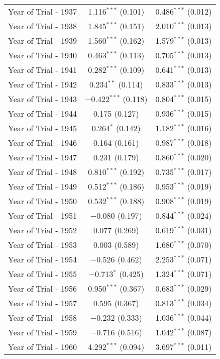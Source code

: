 \begin{table}[!h]
\begin{tabular}{@{\extracolsep{5pt}}lcc}
  Year of Trial - 1937 & 1.116$^{***}$ (0.101) & 0.486$^{***}$ (0.012) \\ 
  Year of Trial - 1938 & 1.845$^{***}$ (0.151) & 2.010$^{***}$ (0.013) \\ 
  Year of Trial - 1939 & 1.560$^{***}$ (0.162) & 1.579$^{***}$ (0.013) \\ 
  Year of Trial - 1940 & 0.463$^{***}$ (0.113) & 0.705$^{***}$ (0.013) \\ 
  Year of Trial - 1941 & 0.282$^{***}$ (0.109) & 0.641$^{***}$ (0.013) \\ 
  Year of Trial - 1942 & 0.234$^{**}$ (0.114) & 0.833$^{***}$ (0.013) \\ 
  Year of Trial - 1943 & $-$0.422$^{***}$ (0.118) & 0.804$^{***}$ (0.015) \\ 
  Year of Trial - 1944 & 0.175 (0.127) & 0.936$^{***}$ (0.015) \\ 
  Year of Trial - 1945 & 0.264$^{*}$ (0.142) & 1.182$^{***}$ (0.016) \\ 
  Year of Trial - 1946 & 0.164 (0.161) & 0.987$^{***}$ (0.018) \\ 
  Year of Trial - 1947 & 0.231 (0.179) & 0.860$^{***}$ (0.020) \\ 
  Year of Trial - 1948 & 0.810$^{***}$ (0.192) & 0.735$^{***}$ (0.017) \\ 
  Year of Trial - 1949 & 0.512$^{***}$ (0.186) & 0.953$^{***}$ (0.019) \\ 
  Year of Trial - 1950 & 0.532$^{***}$ (0.188) & 0.908$^{***}$ (0.019) \\ 
  Year of Trial - 1951 & $-$0.080 (0.197) & 0.844$^{***}$ (0.024) \\ 
  Year of Trial - 1952 & 0.077 (0.269) & 0.619$^{***}$ (0.031) \\ 
  Year of Trial - 1953 & 0.003 (0.589) & 1.680$^{***}$ (0.070) \\ 
  Year of Trial - 1954 & $-$0.526 (0.462) & 2.253$^{***}$ (0.071) \\ 
  Year of Trial - 1955 & $-$0.713$^{*}$ (0.425) & 1.324$^{***}$ (0.071) \\ 
  Year of Trial - 1956 & 0.950$^{***}$ (0.367) & 0.683$^{***}$ (0.029) \\ 
  Year of Trial - 1957 & 0.595 (0.367) & 0.813$^{***}$ (0.034) \\ 
  Year of Trial - 1958 & $-$0.232 (0.333) & 1.036$^{***}$ (0.044) \\ 
  Year of Trial - 1959 & $-$0.716 (0.516) & 1.042$^{***}$ (0.087) \\ 
  Year of Trial - 1960 & 4.292$^{***}$ (0.094) & 3.697$^{***}$ (0.011) \\ 

\end{tabular}
\end{table}
